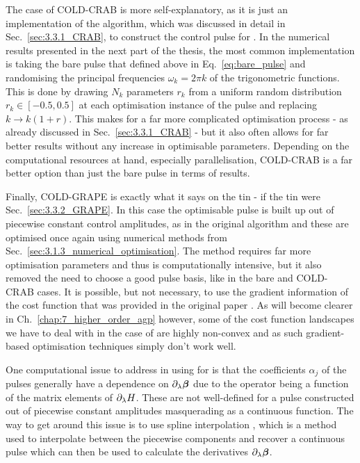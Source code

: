 The case of COLD-CRAB is more self-explanatory, as it is just an implementation of the  algorithm, which was discussed in detail in Sec.~\ref{sec:3.3.1_CRAB}, to construct the control pulse for . In the numerical results presented in the next part of the thesis, the most common implementation is taking the bare pulse that defined above in Eq.~\eqref{eq:bare_pulse} and randomising the principal frequencies $\omega_k = 2 \pi k$ of the trigonometric functions. This is done by drawing $N_k$ parameters $r_k$ from a uniform random distribution $r_k \in [-0.5,0.5]$ at each optimisation instance of the pulse and replacing $k \rightarrow k(1+r)$. This makes for a far more complicated optimisation process - as already discussed in Sec.~\ref{sec:3.3.1_CRAB} - but it also often allows for far better results without any increase in optimisable parameters. Depending on the computational resources at hand, especially parallelisation, COLD-CRAB is a far better option than just the bare pulse in terms of results.

Finally, COLD-GRAPE is exactly what it says on the tin - if the tin were Sec.~\ref{sec:3.3.2_GRAPE}. In this case the optimisable pulse is built up out of piecewise constant control amplitudes, as in the original  algorithm and these are optimised once again using numerical methods from Sec.~\ref{sec:3.1.3_numerical_optimisation}. The method requires far more optimisation parameters and thus is computationally intensive, but it also removed the need to choose a good pulse basis, like in the bare and COLD-CRAB cases. It is possible, but not necessary, to use the gradient information of the cost function that was provided in the original  paper \cite{khaneja_optimal_2005}. As will become clearer in Ch.~\ref{chap:7_higher_order_agp} however, some of the cost function landscapes we have to deal with in the case of  are highly non-convex and as such gradient-based optimisation techniques simply don't work well. 

One computational issue to address in using  for  is that the coefficients $\alpha_j$ of the  pulses generally have a dependence on $\partial_{\lambda} \boldsymbol{\beta}$ due to the  operator being a function of the matrix elements of $\partial_{\lambda} H$. These are not well-defined for a pulse constructed out of piecewise constant amplitudes masquerading as a continuous function. The way to get around this issue is to use spline interpolation \cite{noauthor_spline_nodate}, which is a method used to interpolate between the piecewise components and recover a continuous pulse which can then be used to calculate the derivatives $\partial_{\lambda} \boldsymbol{\beta}$. 


